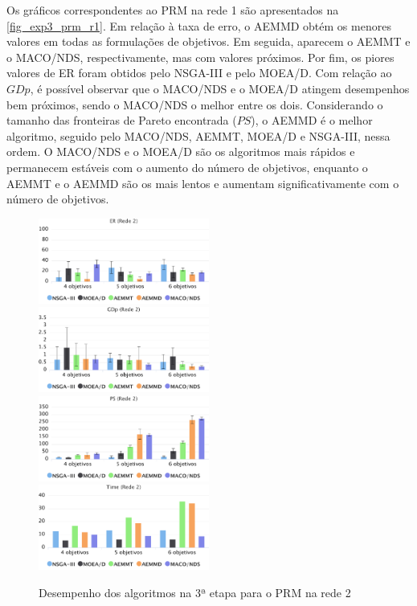 Os gráficos correspondentes ao PRM na rede 1 são apresentados na \autoref{fig_exp3_prm_r1}. Em relação à taxa de erro, o AEMMD obtém os menores valores em todas as formulações de objetivos. Em seguida, aparecem o AEMMT e o MACO/NDS, respectivamente, mas com valores próximos. Por fim, os piores valores de ER foram obtidos pelo NSGA-III e pelo MOEA/D. Com relação ao $GDp$, é possível observar que o MACO/NDS e o MOEA/D atingem desempenhos bem próximos, sendo o MACO/NDS o melhor entre os dois. Considerando o tamanho das fronteiras de Pareto encontrada ($PS$), o AEMMD é o melhor algoritmo, seguido pelo MACO/NDS, AEMMT, MOEA/D e NSGA-III, nessa ordem. O MACO/NDS e o MOEA/D são os algoritmos mais rápidos e permanecem estáveis com o aumento do número de objetivos, enquanto o AEMMT e o AEMMD são os mais lentos e aumentam significativamente com o número de objetivos.

\begin{figure}[!htbp]	
	\includegraphics[width=0.5\textwidth]{cap_experimentos/figs/etapa3/er-mrp-r2}
	\includegraphics[width=0.5\textwidth]{cap_experimentos/figs/etapa3/gd-mrp-r2}
	\includegraphics[width=0.5\textwidth]{cap_experimentos/figs/etapa3/ps-mrp-r2}
	\includegraphics[width=0.5\textwidth]{cap_experimentos/figs/etapa3/time-mrp-r2}
	\caption{\label{fig_exp3_prm_r2}Desempenho dos algoritmos na 3ª etapa para o PRM na rede 2}
\end{figure}

